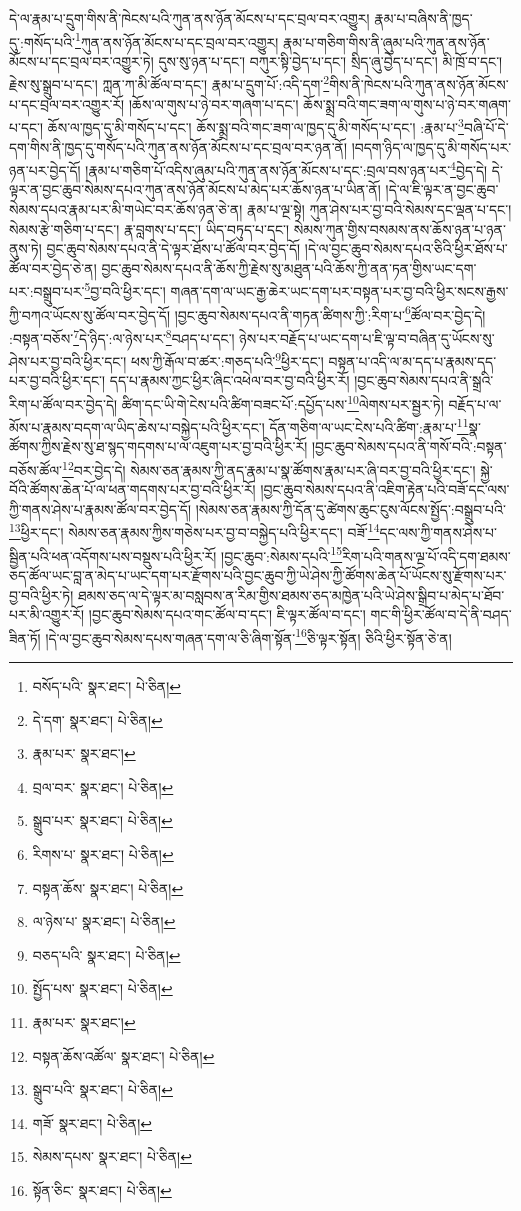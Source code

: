 དེ་ལ་རྣམ་པ་དྲུག་གིས་ནི་ཁེངས་པའི་ཀུན་ནས་ཉོན་མོངས་པ་དང་བྲལ་བར་འགྱུར། རྣམ་པ་བཞིས་ནི་ཁྱད་དུ་:གསོད་པའི་\footnote{བསོད་པའི་  སྣར་ཐང་།  པེ་ཅིན། }ཀུན་ནས་ཉོན་མོངས་པ་དང་བྲལ་བར་འགྱུར། རྣམ་པ་གཅིག་གིས་ནི་ཞུམ་པའི་ཀུན་ནས་ཉོན་མོངས་པ་དང་བྲལ་བར་འགྱུར་ཏེ། དུས་སུ་ཉན་པ་དང་། བཀུར་སྟི་བྱེད་པ་དང་། སྲིད་ཞུ་བྱེད་པ་དང་། མི་ཁྲོ་བ་དང་། རྗེས་སུ་སྒྲུབ་པ་དང་། ཀླན་ཀ་མི་ཚོལ་བ་དང་། རྣམ་པ་དྲུག་པོ་:འདི་དག་\footnote{དེ་དག་  སྣར་ཐང་།  པེ་ཅིན། }གིས་ནི་ཁེངས་པའི་ཀུན་ནས་ཉོན་མོངས་པ་དང་བྲལ་བར་འགྱུར་རོ། །ཆོས་ལ་གུས་པ་ཉེ་བར་གཞག་པ་དང་། ཆོས་སྨྲ་བའི་གང་ཟག་ལ་གུས་པ་ཉེ་བར་གཞག་པ་དང་། ཆོས་ལ་ཁྱད་དུ་མི་གསོད་པ་དང་། ཆོས་སྨྲ་བའི་གང་ཟག་ལ་ཁྱད་དུ་མི་གསོད་པ་དང་། :རྣམ་པ་\footnote{རྣམ་པར་  སྣར་ཐང་། }བཞི་པོ་དེ་དག་གིས་ནི་ཁྱད་དུ་གསོད་པའི་ཀུན་ནས་ཉོན་མོངས་པ་དང་བྲལ་བར་ཉན་ནོ། །བདག་ཉིད་ལ་ཁྱད་དུ་མི་གསོད་པར་ཉན་པར་བྱེད་དོ། །རྣམ་པ་གཅིག་པོ་འདིས་ཞུམ་པའི་ཀུན་ནས་ཉོན་མོངས་པ་དང་:བྲལ་བས་ཉན་པར་\footnote{བྲལ་བར་  སྣར་ཐང་།  པེ་ཅིན། }བྱེད་དེ། དེ་ལྟར་ན་བྱང་ཆུབ་སེམས་དཔའ་ཀུན་ནས་ཉོན་མོངས་པ་མེད་པར་ཆོས་ཉན་པ་ཡིན་ནོ། །དེ་ལ་ཇི་ལྟར་ན་བྱང་ཆུབ་སེམས་དཔའ་རྣམ་པར་མི་གཡེང་བར་ཆོས་ཉན་ཅེ་ན། རྣམ་པ་ལྔ་སྟེ། ཀུན་ཤེས་པར་བྱ་བའི་སེམས་དང་ལྡན་པ་དང་། སེམས་རྩེ་གཅིག་པ་དང་། རྣ་བླགས་པ་དང་། ཡིད་བཏུད་པ་དང་། སེམས་ཀུན་གྱིས་བསམས་ནས་ཆོས་ཉན་པ་ཉན་ནུས་ཏེ། བྱང་ཆུབ་སེམས་དཔའ་ནི་དེ་ལྟར་ཐོས་པ་ཚོལ་བར་བྱེད་དོ། །དེ་ལ་བྱང་ཆུབ་སེམས་དཔའ་ཅིའི་ཕྱིར་ཐོས་པ་ཚོལ་བར་བྱེད་ཅེ་ན། བྱང་ཆུབ་སེམས་དཔའ་ནི་ཆོས་ཀྱི་རྗེས་སུ་མཐུན་པའི་ཆོས་ཀྱི་ནན་ཏན་གྱིས་ཡང་དག་པར་:བསྒྲུབ་པར་\footnote{སྒྲུབ་པར་  སྣར་ཐང་།  པེ་ཅིན། }བྱ་བའི་ཕྱིར་དང་། གཞན་དག་ལ་ཡང་རྒྱ་ཆེར་ཡང་དག་པར་བསྟན་པར་བྱ་བའི་ཕྱིར་སངས་རྒྱས་ཀྱི་བཀའ་ཡོངས་སུ་ཚོལ་བར་བྱེད་དོ། །བྱང་ཆུབ་སེམས་དཔའ་ནི་གཏན་ཚིགས་ཀྱི་:རིག་པ་\footnote{རིགས་པ་  སྣར་ཐང་།  པེ་ཅིན། }ཚོལ་བར་བྱེད་དེ། :བསྟན་བཅོས་\footnote{བསྟན་ཆོས་  སྣར་ཐང་།  པེ་ཅིན། }དེ་ཉིད་:ལ་ཉེས་པར་\footnote{ལ་ཉེས་པ་  སྣར་ཐང་།  པེ་ཅིན། }བཤད་པ་དང་། ཉེས་པར་བརྗོད་པ་ཡང་དག་པ་ཇི་ལྟ་བ་བཞིན་དུ་ཡོངས་སུ་ཤེས་པར་བྱ་བའི་ཕྱིར་དང་། ཕས་ཀྱི་རྒོལ་བ་ཚར་:གཅད་པའི་\footnote{བཅད་པའི་  སྣར་ཐང་།  པེ་ཅིན། }ཕྱིར་དང་། བསྟན་པ་འདི་ལ་མ་དད་པ་རྣམས་དད་པར་བྱ་བའི་ཕྱིར་དང་། དད་པ་རྣམས་ཀྱང་ཕྱིར་ཞིང་འཕེལ་བར་བྱ་བའི་ཕྱིར་རོ། །བྱང་ཆུབ་སེམས་དཔའ་ནི་སྒྲའི་རིག་པ་ཚོལ་བར་བྱེད་དེ། ཚིག་དང་ཡི་གེ་ངེས་པའི་ཚིག་བཟང་པོ་:དཔྱོད་པས་\footnote{སྤྱོད་པས་  སྣར་ཐང་།  པེ་ཅིན། }ལེགས་པར་སྦྱར་ཏེ། བརྗོད་པ་ལ་མོས་པ་རྣམས་བདག་ལ་ཡིད་ཆེས་པ་བསྐྱེད་པའི་ཕྱིར་དང་། དོན་གཅིག་ལ་ཡང་ངེས་པའི་ཚིག་:རྣམ་པ་\footnote{རྣམ་པར་  སྣར་ཐང་། }སྣ་ཚོགས་ཀྱིས་རྗེས་སུ་ཐ་སྙད་གདགས་པ་ལ་འཇུག་པར་བྱ་བའི་ཕྱིར་རོ། །བྱང་ཆུབ་སེམས་དཔའ་ནི་གསོ་བའི་:བསྟན་བཅོས་ཚོལ་\footnote{བསྟན་ཆོས་འཚོལ་  སྣར་ཐང་།  པེ་ཅིན། }བར་བྱེད་དེ། སེམས་ཅན་རྣམས་ཀྱི་ནད་རྣམ་པ་སྣ་ཚོགས་རྣམ་པར་ཞི་བར་བྱ་བའི་ཕྱིར་དང་། སྐྱེ་བོའི་ཚོགས་ཆེན་པོ་ལ་ཕན་གདགས་པར་བྱ་བའི་ཕྱིར་རོ། །བྱང་ཆུབ་སེམས་དཔའ་ནི་འཇིག་རྟེན་པའི་བཟོ་དང་ལས་ཀྱི་གནས་ཤེས་པ་རྣམས་ཚོལ་བར་བྱེད་དོ། །སེམས་ཅན་རྣམས་ཀྱི་དོན་དུ་ཚེགས་ཆུང་ངུས་ལོངས་སྤྱོད་:བསྒྲུབ་པའི་\footnote{སྒྲུབ་པའི་  སྣར་ཐང་།  པེ་ཅིན། }ཕྱིར་དང་། སེམས་ཅན་རྣམས་ཀྱིས་གཅེས་པར་བྱ་བ་བསྐྱེད་པའི་ཕྱིར་དང་། བཟོ་\footnote{གཟོ་  སྣར་ཐང་།  པེ་ཅིན། }དང་ལས་ཀྱི་གནས་ཤེས་པ་སྦྱིན་པའི་ཕན་འདོགས་པས་བསྡུས་པའི་ཕྱིར་རོ། །བྱང་ཆུབ་:སེམས་དཔའི་\footnote{སེམས་དཔས་  སྣར་ཐང་།  པེ་ཅིན། }རིག་པའི་གནས་ལྔ་པོ་འདི་དག་ཐམས་ཅད་ཚོལ་ཡང་བླ་ན་མེད་པ་ཡང་དག་པར་རྫོགས་པའི་བྱང་ཆུབ་ཀྱི་ཡེ་ཤེས་ཀྱི་ཚོགས་ཆེན་པོ་ཡོངས་སུ་རྫོགས་པར་བྱ་བའི་ཕྱིར་ཏེ། ཐམས་ཅད་ལ་དེ་ལྟར་མ་བསླབས་ན་རིམ་གྱིས་ཐམས་ཅད་མཁྱེན་པའི་ཡེ་ཤེས་སྒྲིབ་པ་མེད་པ་ཐོབ་པར་མི་འགྱུར་རོ། །བྱང་ཆུབ་སེམས་དཔའ་གང་ཚོལ་བ་དང་། ཇི་ལྟར་ཚོལ་བ་དང་། གང་གི་ཕྱིར་ཚོལ་བ་དེ་ནི་བཤད་ཟིན་ཏོ། །དེ་ལ་བྱང་ཆུབ་སེམས་དཔས་གཞན་དག་ལ་ཅི་ཞིག་སྟོན་\footnote{སྟོན་ཅིང་  སྣར་ཐང་།  པེ་ཅིན། }ཅི་ལྟར་སྟོན། ཅིའི་ཕྱིར་སྟོན་ཅེ་ན། 